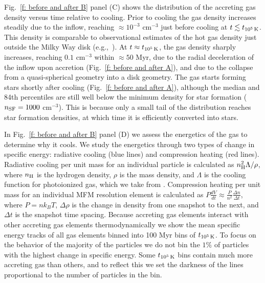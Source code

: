 \documentclass[fleqn,usenatbib]{mnras}
\newcommand{\tcools}{t_{10^5\,{\rm K}}}
\newcommand{\nH}{n_{\rm H}}
\begin{document}
Fig.~\ref{f: before and after B} panel (C) shows the distribution of the accreting gas density versus time relative to cooling.
Prior to cooling the gas density increases steadily due to the inflow, reaching $\approx10^{-3}$ cm$^{-3}$ just before cooling at $t\lesssim\tcools$.
This density is comparable to observational estimates of the hot gas density just outside the Milky Way disk (e.g.,~\citealt{Li2017a}).
At $t\approx\tcools$, the gas density sharply increases, reaching $0.1$ cm$^{-3}$ within $\approx50$ Myr, due to the radial deceleration of the inflow upon accretion (Fig.~\ref{f: before and after A}), and due to the collapse from a quasi-spherical geometry into a disk geometry.
The gas starts forming stars shortly after cooling (Fig.~\ref{f: before and after A}), although the median and 84th percentiles are still well below the minimum density for star formation ($n_{\rm SF} = 1000$ cm$^{-3}$).
This is because only a small tail of the distribution reaches star formation densities, at which time it is efficiently converted into stars.

In Fig.~\ref{f: before and after B} panel (D) we assess the energetics of the gas to determine why it cools.
We study the energetics through two types of change in specific energy: radiative cooling (blue lines) and compression heating (red lines).
Radiative cooling per unit mass for an individual particle is calculated as $\nH^2 \Lambda / \rho$, where $\nH$ is the hydrogen density, $\rho$ is the mass density, and $\Lambda$ is the cooling function for photoionized gas, which we take from \cite{Wiersma2009a}.
Compression heating per unit mass for an individual MFM resolution element is calculated as $P \frac{dV}{dt} \approx \frac{ P }{ n^2 } \frac{ \Delta n }{ \Delta t }$, where $P = n k_B T$, $\Delta \rho$ is the change in density from one snapshot to the next, and $\Delta t$ is the snapshot time spacing.
Because accreting gas elements interact with other accreting gas elements thermodynamically we show the mean specific energy tracks of all gas elements binned into 100 Myr bins of $\tcools$.
To focus on the behavior of the majority of the particles we do not bin the $1\%$ of particles with the highest change in specific energy.
Some $\tcools$ bins contain much more accreting gas than others, and to reflect this we set the darkness of the lines proportional to the number of particles in the bin.
\end{document}
